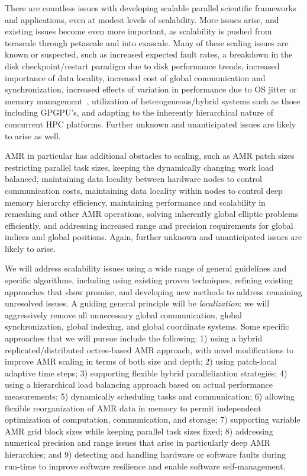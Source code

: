 \documentclass[11pt,letterpaper]{article}
\begin{document}
 There are countless issues
with developing scalable parallel scientific frameworks and
applications, even at modest levels of scalability.  More issues
arise, and existing issues become even more important, as scalability is pushed
from terascale through petascale and into exascale.  Many of these
scaling issues are known or suspected, such as
%
increased expected fault rates,
%
a breakdown in the disk checkpoint/restart paradigm due to disk
performance trends,
%
%
increased importance of data locality,
%
increased cost of global communication and synchronization,
%
%
increased effects of variation in performance due to OS
jitter or memory management~\cite{StSh09},
%
utilization of heterogeneous/hybrid systems such as those including
GPGPU's,
%
and adapting to the inherently hierarchical nature of concurrent HPC
platforms.  Further unknown and unanticipated issues are likely to arise
as well.

AMR in particular has additional
obstacles to scaling, such as
%
AMR patch sizes restricting parallel task sizes,
%
keeping the dynamically changing work load balanced,
%
maintaining data locality between hardware nodes to control
communication costs,
%
maintaining data locality within nodes to control deep memory hierarchy
efficiency,
%
maintaining performance and scalability in remeshing and other AMR
operations,
%
solving inherently global elliptic problems efficiently,
%
and addressing increased range and precision requirements for global
indices and global positions.
%
Again, further unknown and unanticipated issues are likely to arise.

 We will address scalability issues
using a wide range of general guidelines and specific algorithms,
including using existing proven techniques, refining existing
approaches that show promise, and developing new methods to
address remaining unresolved issues.  A guiding general principle will
be \textit{localization}: we will aggressively remove all unnecessary global
communication, global synchronization, global indexing, and global
coordinate systems.  Some specific approaches that we will pursue
include the following:
%
1) using a hybrid replicated/distributed octree-based AMR approach, with
novel modifications to improve AMR scaling in terms of both size 
and depth;
% 
2) using patch-local adaptive time steps;
% 
3) supporting flexible hybrid parallelization strategies;
% 
4) using a hierarchical load balancing approach based on actual
performance measurements;
% 
5) dynamically scheduling tasks and communication;
% 
6) allowing flexible reorganization of AMR data in memory to permit
independent optimization of computation, communication, and storage;
% 
7) supporting variable AMR grid block sizes while keeping
parallel task sizes fixed;
% 
8) addressing numerical precision and range issues that arise in
particularly deep AMR hierarchies;
% 
and 9) detecting and handling hardware or software faults during
run-time to improve software resilience and enable software
self-management.
\end{document}
